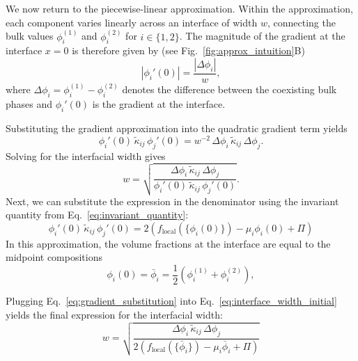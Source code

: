\documentclass[12pt]{article}
\begin{document}
We now return to the piecewise-linear approximation.
Within the approximation, each component varies linearly across an interface of width $w$,
connecting the bulk values $\phi_i^{(1)}$ and $\phi_i^{(2)}$ for $i \in \{1,2\}$. The magnitude of the
gradient at the interface \(x=0\) is therefore given by (see Fig.~\ref{fig:approx_intuition}B)
\[
    | \phi_i'(0)|= \frac{|\Delta \phi_i|}{w},
\]
where $\Delta \phi_i = \phi_i^{(1)} - \phi_i^{(2)}$ denotes the difference between the
coexisting bulk phases and \(\phi_i'(0)\) is the gradient at the interface.

Substituting the gradient approximation into the quadratic gradient term
yields
\[
      {\phi}_i'(0)\, \tilde\kappa_{ij}\,  \phi_j'(0)
    =
    w^{-2}\,\Delta \phi_i\, \tilde\kappa_{ij}\, \Delta \phi_j.
\]
Solving for the interfacial width gives
\begin{equation}
    w
    =
    \sqrt{
    \frac{
        \Delta \phi_i\, \tilde\kappa_{ij}\, \Delta \phi_j
    }{
        \phi_i'(0)\, \tilde\kappa_{ij}\, \phi_j'(0)
    }
    }.
    \label{eq:interface_width_initial}
\end{equation}
Next, we can substitute the expression in the denominator using the invariant quantity from Eq.~\eqref{eq:invariant_quantity}:
\begin{equation}
        \phi_i'(0)\, \tilde\kappa_{ij}\, \phi_j'(0) = 2\left(
        f_{\mathrm{local}}(\{\phi_i(0)\})
        - \mu_i \phi_i(0)
        + \Pi
        \right)
    \label{eq:gradient_substitution}
\end{equation}
In this approximation, the volume fractions at the interface are equal to the midpoint compositions
\[
    \phi_i(0)=\bar{\phi}_i = \frac{1}{2}\left(\phi_i^{(1)} + \phi_i^{(2)}\right),
\]

Plugging Eq.~\eqref{eq:gradient_substitution} into Eq.~\eqref{eq:interface_width_initial} yields the final expression for the interfacial width:
\begin{equation}
    w
    =
    \sqrt{
    \frac{
        \Delta \phi_i\, \tilde\kappa_{ij}\, \Delta \phi_j
    }{
        2\left(
        f_{\mathrm{local}}(\{\bar{\phi}_i\})
        - \mu_i \bar{\phi}_i
        + \Pi
        \right)
    }}
    \label{eq:interface_width_approximation}
\end{equation}
\end{document}
